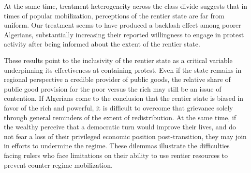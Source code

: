 \documentclass[12pt, letterpaper]{article}
\begin{document}
At the same time, treatment heterogeneity across the class divide suggests that in times of popular mobilization, perceptions of the rentier state are far from uniform. Our treatment seems to have produced a backlash effect among poorer Algerians, substantially increasing their reported willingness to engage in protest activity after being informed about the extent of the rentier state.

These results point to the inclusivity of the rentier state as a critical variable underpinning its effectiveness at containing protest. Even if the state remains in regional perspective a credible provider of public goods, the relative share of public good provision for the poor versus the rich may still be an issue of contention. If Algerians come to the conclusion that the rentier state is biased in favor of the rich and powerful, it is difficult to overcome that grievance solely through general reminders of the extent of redistribution. At the same time, if the wealthy perceive that a democratic turn would improve their lives, and do not fear a loss of their privileged economic position post-transition, they may join in efforts to undermine the regime. These dilemmas illustrate the difficulties facing rulers who face limitations on their ability to use rentier resources to prevent counter-regime mobilization.

\printbibliography
\end{document}
